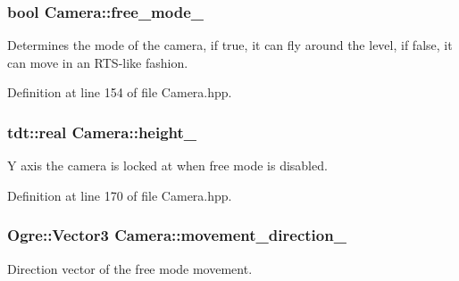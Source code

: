 \subsubsection[{\texorpdfstring{free\+\_\+mode\+\_\+}{free_mode_}}]{\setlength{\rightskip}{0pt plus 5cm}bool Camera\+::free\+\_\+mode\+\_\+\hspace{0.3cm}{\ttfamily [private]}}\hypertarget{class_camera_ab9e64d468f4bdc04492a6a326c8dc2ff}{}\label{class_camera_ab9e64d468f4bdc04492a6a326c8dc2ff}


Determines the mode of the camera, if true, it can fly around the level, if false, it can move in an R\+T\+S-\/like fashion. 



Definition at line 154 of file Camera.\+hpp.

\subsubsection[{\texorpdfstring{height\+\_\+}{height_}}]{\setlength{\rightskip}{0pt plus 5cm}tdt\+::real Camera\+::height\+\_\+\hspace{0.3cm}{\ttfamily [private]}}\hypertarget{class_camera_ab1238ca5c0a615278712ff93c50c095b}{}\label{class_camera_ab1238ca5c0a615278712ff93c50c095b}


Y axis the camera is locked at when free mode is disabled. 



Definition at line 170 of file Camera.\+hpp.

\subsubsection[{\texorpdfstring{movement\+\_\+direction\+\_\+}{movement_direction_}}]{\setlength{\rightskip}{0pt plus 5cm}Ogre\+::\+Vector3 Camera\+::movement\+\_\+direction\+\_\+\hspace{0.3cm}{\ttfamily [private]}}\hypertarget{class_camera_aa3b2cb044a4fd23eb8b3426e10ad0393}{}\label{class_camera_aa3b2cb044a4fd23eb8b3426e10ad0393}


Direction vector of the free mode movement. 



